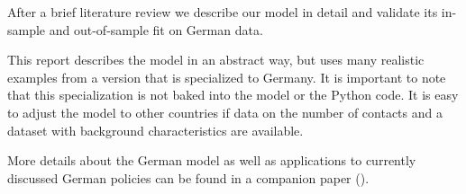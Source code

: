 After a brief literature review we describe our model in detail and validate its in-sample and out-of-sample fit on German data.

This report describes the model in an abstract way, but uses many realistic examples from a version that is specialized to Germany. It is important to note that this specialization is not baked into the model or the Python code. It is easy to adjust the model to other countries if data on the number of contacts and a dataset with background characteristics are available.

More details about the German model as well as applications to currently discussed German policies can be found in a companion paper (\cite{Dorn2020a}).
